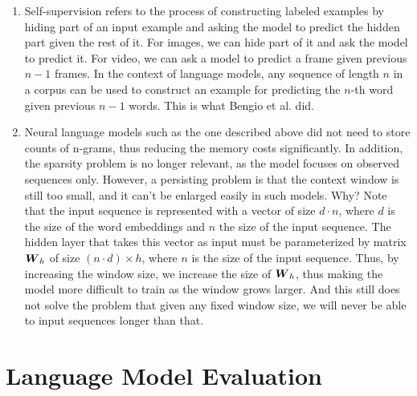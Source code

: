 \documentclass[11pt,a4paper]{article}
\begin{document}
\begin{enumerate}[label=(\alph*)]
          As parameters, let $\mW_w\in \bb{R}^{|V|\times d}$ be the word
          embedding matrix in the input embedding layer,
          $\mW_h\in\bb{R}^{(n\cdot d)\times h}$ be the weight matrix for the
          hidden layer with $n$ being the (maximum) number of input tokens,
          and $\mW_s\in\bb{R}^{h\times |V|}$ be the weight matrix for the
          softmax layer.
          Then, the model was parameterized by
          $\vtheta = \{\mW_w, \mW_h, \mW_s\}$.
    \item Self-supervision refers to the process of constructing labeled
          examples by hiding part of an input example and asking the model to
          predict the hidden part given the rest of it.
          For images, we can hide part of it and ask the model to predict it.
          For video, we can ask a model to predict a frame given previous $n-1$
          frames.
          In the context of language models, any sequence of length $n$ in a
          corpus can be used to construct an example for predicting the $n$-th
          word given previous $n-1$ words.
          This is what Bengio et al. did.
    \item Neural language models such as the one described above did not need to
          store counts of n-grams, thus reducing the memory costs significantly.
          In addition, the sparsity problem is no longer relevant, as the model
          focuses on observed sequences only.
          However, a persisting problem is that the context window is still too
          small, and it can't be enlarged easily in such models.
          Why? Note that the input sequence is represented with a vector of size
          $d\cdot n$, where $d$ is the size of the word embeddings and $n$ the
          size of the input sequence.
          The hidden layer that takes this vector as input must be parameterized
          by matrix ${\boldsymbol{W}}_h$ of size $(n\cdot d)\times h$, where $n$ is the size
          of the input sequence.
          Thus, by increasing the window size, we increase the size of ${\boldsymbol{W}}_h$,
          thus making the model more difficult to train as the window grows
          larger.
          And this still does not solve the problem that given any fixed window
          size, we will never be able to input sequences longer than that.
\end{enumerate}

\section{Language Model Evaluation}
\end{document}
